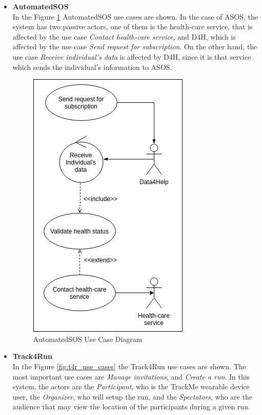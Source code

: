 \documentclass[a4paper, hidelinks, 12pt]{report}
\begin{document}
\begin{itemize}
		\item{\textbf{AutomatedSOS}}\\
		In the Figure \ref{fig:asos_use_cases} AutomatedSOS use cases are shown. In the case of ASOS, the system has two passive actors, one of them is the health-care service, that is affected by the use case \textit{Contact health-care service}, and D4H, which is affected by the use case \textit{Send request for subscription}. On the other hand, the use case \textit{Receive individual's data} is affected by D4H, since it is that service which sends the individual's information to ASOS.
		
		\begin{figure}[H]
			\centering
			\includegraphics[scale=0.7]{Diagrams/asos_use_cases.png}
			\caption[AutomatedSOS Use Case Diagram]{AutomatedSOS Use Case Diagram}
			\label{fig:asos_use_cases}
		\end{figure}
		
		\item{\textbf{Track4Run}}\\
		In the Figure \ref{fig:t4r_use_cases} the Track4Run use cases are shown. The most important use cases are \textit{Manage invitations}, and \textit{Create a run}. In this system, the actors are the \textit{Participant}, who is the TrackMe wearable device user, the \textit{Organizer}, who will setup the run, and the \textit{Spectators}, who are the audience that may view the location of the participants during a given run.
		

\end{itemize}
\end{document}
